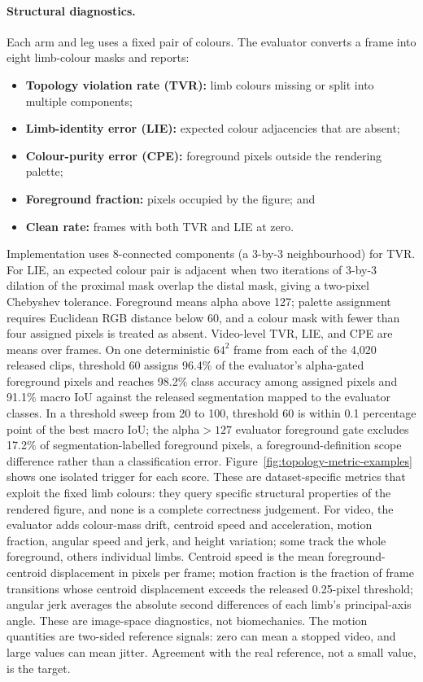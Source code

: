 \documentclass[10pt,twocolumn]{article}
\begin{document}
\paragraph{Structural diagnostics.} Each arm and leg uses a fixed pair of colours. The evaluator converts a
frame into eight limb-colour masks and reports:
\begin{itemize}\setlength\itemsep{0pt}
    \item \textbf{Topology violation rate (TVR):} limb colours missing or split into multiple components;
    \item \textbf{Limb-identity error (LIE):} expected colour adjacencies that are absent;
    \item \textbf{Colour-purity error (CPE):} foreground pixels outside the rendering palette;
    \item \textbf{Foreground fraction:} pixels occupied by the figure; and
    \item \textbf{Clean rate:} frames with both TVR and LIE at zero.
\end{itemize}
Implementation uses 8-connected components (a 3-by-3 neighbourhood) for TVR. For LIE, an expected colour
pair is adjacent when two iterations of 3-by-3 dilation of the proximal mask overlap the distal mask, giving
a two-pixel Chebyshev tolerance. Foreground means alpha above 127; palette assignment requires Euclidean RGB
distance below 60, and a colour mask with fewer than four assigned pixels is treated as absent. Video-level
TVR, LIE, and CPE are means over frames.
On one deterministic $64^2$ frame from each of the 4,020 released clips, threshold 60 assigns 96.4\% of the
evaluator's alpha-gated foreground pixels and reaches 98.2\% class accuracy among assigned pixels and
91.1\% macro IoU against the released segmentation mapped to the evaluator classes. In a threshold sweep
from 20 to 100, threshold 60 is within 0.1 percentage point of the best macro IoU; the alpha${>}127$
evaluator foreground gate excludes 17.2\% of segmentation-labelled foreground pixels, a
foreground-definition scope difference rather than a classification error.
Figure~\ref{fig:topology-metric-examples} shows one isolated trigger for each score.
These are dataset-specific metrics that exploit the fixed limb colours: they query specific structural
properties of the rendered figure, and none is a complete correctness judgement. For video, the evaluator adds
colour-mass drift, centroid speed and acceleration, motion fraction, angular speed and jerk, and height
variation; some track the whole foreground, others individual limbs. Centroid speed is the mean foreground-centroid displacement in
pixels per frame; motion fraction is the fraction of frame transitions whose centroid displacement exceeds the
released 0.25-pixel threshold; angular jerk averages the absolute second differences of each limb's
principal-axis angle. These are image-space diagnostics, not biomechanics. The motion quantities are
two-sided reference signals: zero can mean a stopped video, and large values can mean jitter. Agreement with
the real reference, not a small value, is the target.
\end{document}
